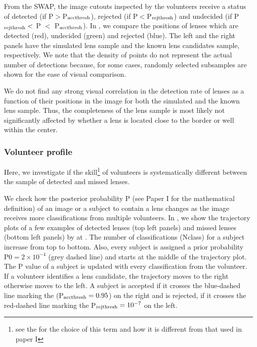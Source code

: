 \documentclass[useAMS,usenatbib,a4paper]{mn2e}
\begin{document}
From the SWAP, the image cutouts inspected by the \sw volunteers receive
a status of detected (if P$>$P$_{\rm acc thresh}$), rejected (if
P$<$P$_{\rm rej thresh}$) and undecided (if P$_{\rm rej thresh}<$ P $<$
P$_{\rm acc thresh}$). In , we compare the positions
of lenses which are detected (red), undecided (green) and rejected
(blue). The left and the right panels have the simulated lens sample and
the known lens candidates sample, respectively. We note that the density
of points do not represent the actual number of detections because, for some
cases, randomly selected subsamples are shown for the ease of visual
comparison.

We do not find any strong visual correlation in the detection rate of
lenses as a function of their positions in the image for both the
simulated and the known lens sample. Thus, the completeness of the lens
sample is most likely not significantly affected by whether a lens is
located close to the border or well within the center.

\subsubsection{Volunteer profile}

Here, we investigate if the skill\footnote{see the
 for the choice of this term and how it is
different from that used in paper I} of volunteers is systematically
different between the sample of detected and missed lenses.

We check how the posterior probability P (see Paper I for the
mathematical definition) of an image or a subject to contain a lens
changes as the image receives more classifications from multiple
volunteers.  In , we show the trajectory plots of a few
examples of detected lenses (top left panels) and missed lenses (bottom
left panels) by \sw at \StageOne. The number of classifications (Nclass)
for a subject increase from top to bottom.  Also, every subject is
assigned a prior probability P0$=2\times10^{-4}$ (grey dashed line) and
starts at the middle of the trajectory plot. The P value of a subject is
updated with every classification from the volunteer.  If a volunteer
identifies a lens candidate, the trajectory moves to the right otherwise
moves to the left. A subject is accepted if it crosses the blue-dashed
line marking the (P$_{\rm acc thresh}=0.95$) on the right and is
rejected, if it crosses the red-dashed line marking the P$_{\rm rej
thresh}=10^{-7}$ on the left.
\end{document}

